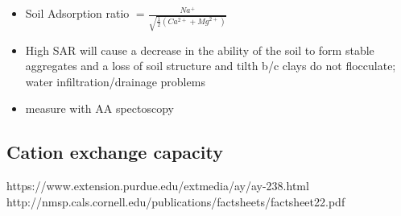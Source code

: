 \documentclass[twoside]{article}	%
\begin{document}
\begin{itemize}
  \item Soil Adsorption ratio $= {\frac {Na^{+}}{\sqrt {{\tfrac {1}{2}}({Ca^{2+}+Mg^{2+}})}}}$
  \item High SAR will cause a decrease in the ability of the soil to form stable aggregates and a loss of soil structure and tilth b/c clays do not flocculate; water infiltration/drainage problems
  \item measure with AA spectoscopy
\end{itemize}


\subsection{Cation exchange capacity}
https://www.extension.purdue.edu/extmedia/ay/ay-238.html\\
http://nmsp.cals.cornell.edu/publications/factsheets/factsheet22.pdf\\






\newpage


\end{document}
